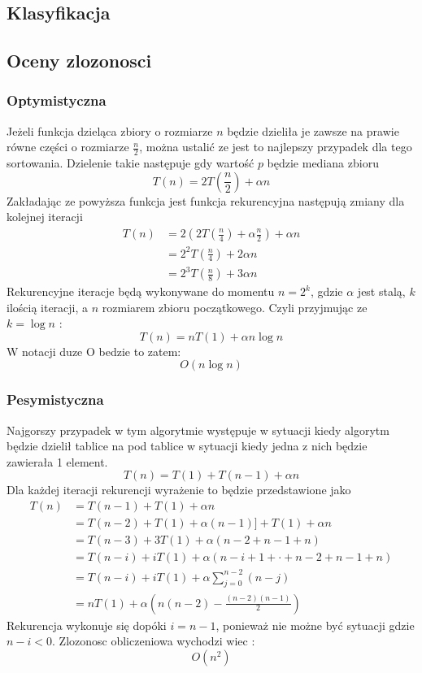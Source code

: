 \subsection{Klasyfikacja}

\subsection{Oceny zlozonosci}
\subsubsection{Optymistyczna}
Jeżeli funkcja dzieląca zbiory o rozmiarze $n$ będzie dzieliła je zawsze na prawie równe części o rozmiarze $\frac{n}{2}$, można ustalić ze jest to najlepszy przypadek dla tego sortowania. Dzielenie takie następuje gdy wartość $p$ będzie mediana zbioru \cite{quicksort}
\begin{equation*}
T(n) = 2T(\frac{n}{2}) +\alpha n
\end{equation*}
Zakładając ze powyższa funkcja jest funkcja rekurencyjna następują zmiany dla kolejnej iteracji
\begin{align*}
 T(n) &= 2(2T(\frac{n}{4}) + \alpha \frac{n}{2}) + \alpha n \\
      &= 2^{2}T( \frac{n}{4}) + 2 \alpha n \\
      &= 2^{3}T( \frac{n}{8}) + 3 \alpha n
 \end{align*}
Rekurencyjne iteracje będą wykonywane do momentu $n = 2^{k}$, gdzie $\alpha$ jest  stalą, $k$ ilością iteracji, a $n$ rozmiarem zbioru początkowego. Czyli przyjmując ze $k = \log n$ :
\begin{equation*}
T(n) =nT(1) +\alpha n \log n
\end{equation*}
W notacji duze O bedzie to zatem:
\begin{equation*}
O(n \log n)
\end{equation*}
\subsubsection{Pesymistyczna}
Najgorszy przypadek w tym algorytmie występuje w sytuacji kiedy algorytm będzie dzielił tablice na pod tablice w sytuacji kiedy jedna z nich będzie zawierała 1 element.
\begin{equation*}
T(n) =T(1) +T(n−1) + \alpha n
\end{equation*}
Dla każdej iteracji rekurencji wyrażenie to będzie przedstawione jako 
\begin{align*}
T(n) &=T(n−1) +T(1) + \alpha n \\
	 &= T(n−2) +T(1) +\alpha(n−1)] +T(1) + \alpha n \\
	 &= T(n−3) + 3T(1) +\alpha(n−2 +n−1 +n) \\
	 &= T(n−i) +iT(1) +\alpha(n−i+ 1 + \cdot + n−2 +n−1 +n) \\
	 &= T(n−i) +iT(1) +\alpha \sum_{j=0}^{n-2}(n-j) \\ 
	 &= nT(1) +\alpha(n(n−2)−\frac{(n−2)(n−1)}{2})
 \end{align*}
Rekurencja wykonuje się dopóki $i=n-1$, ponieważ nie możne być sytuacji gdzie $n-i <0$.
Zlozonosc obliczeniowa wychodzi wiec :
\begin{equation*}
O(n^2)
\end{equation*}
